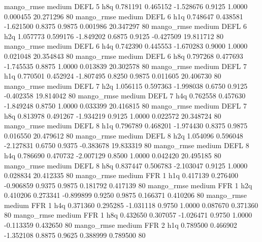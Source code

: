        mango_rmse     medium     DEFL                 5                  h8q  0.781191 0.465152 -1.528676 0.9125 1.0000  0.000455   20.271296 80
       mango_rmse     medium     DEFL                 6                  h1q  0.748647 0.438581 -1.621500 0.8375 0.9875  0.001986   20.347297 80
       mango_rmse     medium     DEFL                 6                  h2q  1.057773 0.599176 -1.849202 0.6875 0.9125 -0.427509   19.811712 80
       mango_rmse     medium     DEFL                 6                  h4q  0.742390 0.445553 -1.670283 0.9000 1.0000  0.021048   20.354843 80
       mango_rmse     medium     DEFL                 6                  h8q  0.797268 0.477693 -1.745535 0.8875 1.0000  0.013839   20.302578 80
       mango_rmse     medium     DEFL                 7                  h1q  0.770501 0.452924 -1.807495 0.8250 0.9875  0.011605   20.406730 80
       mango_rmse     medium     DEFL                 7                  h2q  1.056115 0.597363 -1.998038 0.6750 0.9125 -0.402358   19.814042 80
       mango_rmse     medium     DEFL                 7                  h4q  0.762558 0.457630 -1.849248 0.8750 1.0000  0.033399   20.416815 80
       mango_rmse     medium     DEFL                 7                  h8q  0.813978 0.491267 -1.934219 0.9125 1.0000  0.022572   20.348724 80
       mango_rmse     medium     DEFL                 8                  h1q  0.796789 0.468201 -1.974430 0.8375 0.9875  0.016550   20.479612 80
       mango_rmse     medium     DEFL                 8                  h2q  1.054096 0.596048 -2.127831 0.6750 0.9375 -0.383678   19.833319 80
       mango_rmse     medium     DEFL                 8                  h4q  0.786690 0.470732 -2.007129 0.8500 1.0000  0.042420   20.495185 80
       mango_rmse     medium     DEFL                 8                  h8q  0.837447 0.506783 -2.103047 0.9125 1.0000  0.028834   20.412335 80
       mango_rmse     medium      FFR                 1                  h1q  0.417139 0.276400 -0.906859 0.9375 0.9875  0.181792    0.417139 80
       mango_rmse     medium      FFR                 1                  h2q  0.410206 0.273341 -0.899899 0.9250 0.9875  0.166371    0.410206 80
       mango_rmse     medium      FFR                 1                  h4q  0.371360 0.295285 -1.031118 0.9750 1.0000  0.087670    0.371360 80
       mango_rmse     medium      FFR                 1                  h8q  0.432650 0.307057 -1.026471 0.9750 1.0000 -0.113359    0.432650 80
       mango_rmse     medium      FFR                 2                  h1q  0.789500 0.466902 -1.352108 0.8875 0.9625  0.388999    0.789500 80
